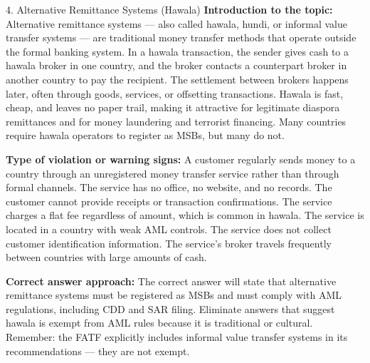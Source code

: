 \documentclass[11pt,a4paper]{beamer}
\begin{document}
\begin{frame}{4. Alternative Remittance Systems (Hawala)}
\tiny
\noindent\textbf{Introduction to the topic:} Alternative remittance systems — also called hawala, hundi, or informal value transfer systems — are traditional money transfer methods that operate outside the formal banking system. In a hawala transaction, the sender gives cash to a hawala broker in one country, and the broker contacts a counterpart broker in another country to pay the recipient. The settlement between brokers happens later, often through goods, services, or offsetting transactions. Hawala is fast, cheap, and leaves no paper trail, making it attractive for legitimate diaspora remittances and for money laundering and terrorist financing. Many countries require hawala operators to register as MSBs, but many do not.

\vspace{0.1cm}
\noindent\textbf{Type of violation or warning signs:} A customer regularly sends money to a country through an unregistered money transfer service rather than through formal channels. The service has no office, no website, and no records. The customer cannot provide receipts or transaction confirmations. The service charges a flat fee regardless of amount, which is common in hawala. The service is located in a country with weak AML controls. The service does not collect customer identification information. The service's broker travels frequently between countries with large amounts of cash.

\vspace{0.1cm}
\noindent\textbf{Correct answer approach:} The correct answer will state that alternative remittance systems must be registered as MSBs and must comply with AML regulations, including CDD and SAR filing. Eliminate answers that suggest hawala is exempt from AML rules because it is traditional or cultural. Remember: the FATF explicitly includes informal value transfer systems in its recommendations — they are not exempt.
\end{frame}
\end{document}
